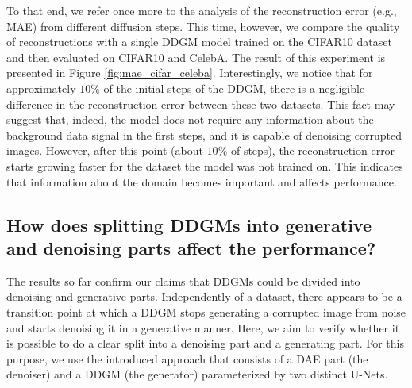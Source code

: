 To that end, we refer once more to the analysis of the reconstruction error (e.g., MAE) from different diffusion steps. This time, however, we compare the quality of reconstructions with a single DDGM model trained on the CIFAR10 dataset and then evaluated on CIFAR10 and CelebA. The result of this experiment is presented in Figure \ref{fig:mae_cifar_celeba}. Interestingly, we notice that for approximately $10\%$ of the initial steps of the DDGM, there is a negligible difference in the reconstruction error between these two datasets. This fact may suggest that, indeed, the model does not require any information about the background data signal in the first steps, and it is capable of denoising corrupted images. However, after this point (about $10\%$ of steps), the reconstruction error starts growing faster for the dataset the model was not trained on. This indicates that information about the domain becomes important and affects performance.


\subsection{How does splitting DDGMs into generative and denoising parts affect the performance?}

The results so far confirm our claims that DDGMs could be divided into denoising and generative parts. Independently of a dataset, there appears to be a transition point at which a DDGM stops generating a corrupted image from noise and starts denoising it in a generative manner. Here, we aim to verify whether it is possible to do a clear split into a denoising part and a generating part. For this purpose, we use the introduced \ours{} approach that consists of a DAE part (the denoiser) and a DDGM (the generator) parameterized by two distinct U-Nets. 

